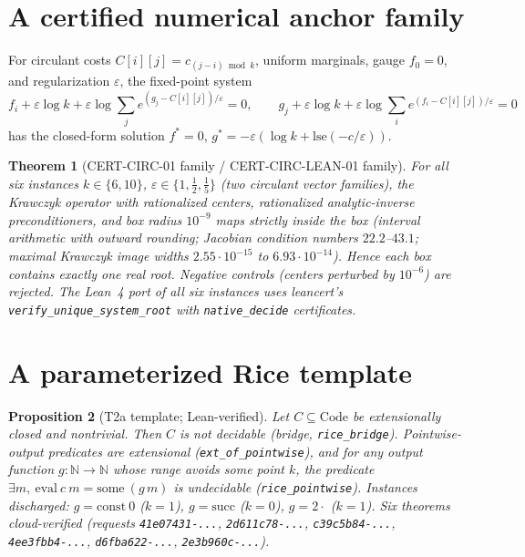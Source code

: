 \documentclass[11pt]{article}
\newtheorem{theorem}{Theorem}
\newtheorem{proposition}[theorem]{Proposition}
\begin{document}
\section{A certified numerical anchor family}
For circulant costs $C[i][j]=c_{(j-i)\bmod k}$, uniform marginals, gauge
$f_0=0$, and regularization $\varepsilon$, the fixed-point system
\[
f_i+\varepsilon\log k+\varepsilon\log\textstyle\sum_j e^{(g_j-C[i][j])/\varepsilon}=0,\qquad
g_j+\varepsilon\log k+\varepsilon\log\textstyle\sum_i e^{(f_i-C[i][j])/\varepsilon}=0
\]
has the closed-form solution $f^*=0$, $g^*=-\varepsilon(\log
k+\mathrm{lse}(-c/\varepsilon))$.
\begin{theorem}[CERT-CIRC-01 family / CERT-CIRC-LEAN-01 family]
For all six instances $k\in\{6,10\}$,
$\varepsilon\in\{1,\tfrac12,\tfrac15\}$ (two circulant vector families), the
Krawczyk operator with rationalized centers, rationalized analytic-inverse
preconditioners, and box radius $10^{-9}$ maps strictly inside the box
(interval arithmetic with outward rounding; Jacobian condition numbers
$22.2$--$43.1$; maximal Krawczyk image widths $2.55\cdot10^{-15}$ to
$6.93\cdot10^{-14}$). Hence each box contains exactly one real root.
Negative controls (centers perturbed by $10^{-6}$) are rejected. The Lean~4
port of all six instances uses \emph{leancert}'s
\texttt{verify\_unique\_system\_root} with \texttt{native\_decide}
certificates.
\end{theorem}

\section{A parameterized Rice template}
\begin{proposition}[T2a template; Lean-verified]
Let $C\subseteq \mathrm{Code}$ be extensionally closed and nontrivial. Then
$C$ is not decidable (bridge, \texttt{rice\_bridge}). Pointwise-output
predicates are extensional (\texttt{ext\_of\_pointwise}), and for any output
function $g:\mathbb{N}\to\mathbb{N}$ whose range avoids some point $k$, the
predicate $\exists m,\ \mathrm{eval}\ c\ m = \mathrm{some}\ (g\,m)$ is
undecidable (\texttt{rice\_pointwise}). Instances discharged:
$g=\mathrm{const}\ 0$ ($k=1$), $g=\mathrm{succ}$ ($k=0$), $g=2\cdot$ ($k=1$).
Six theorems cloud-verified (requests \texttt{41e07431-...},
\texttt{2d611c78-...}, \texttt{c39c5b84-...}, \texttt{4ee3fbb4-...},
\texttt{d6fba622-...}, \texttt{2e3b960c-...}).
\end{proposition}
\end{document}
